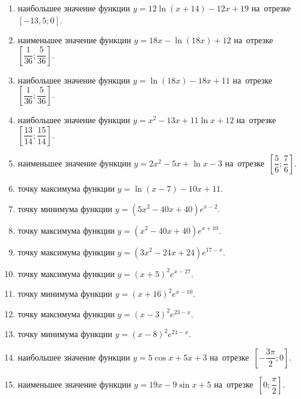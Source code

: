 \documentclass[a4paper,10pt]{article}
\begin{document}
\begin{enumerate}
\item {} наибольшее значение функции $y = 12\ln \left(x+14\right)-12x +19$ на~отрезке~$\left[-13,5;0\right]$.

\item {} наименьшее значение функции $y = 18x-\ln \left(18x\right)+12$ на~отрезке~$\left[\dfrac{1}{36};\dfrac{5}{36}\right]$.

\item {} наибольшее значение функции $y = \ln \left(18x\right)-18x+11$ на~отрезке~$\left[\dfrac{1}{36};\dfrac{5}{36}\right]$.

\item {} наибольшее значение функции $y=x^2-13x+11\ln x+12$ на~отрезке~$\left[\dfrac{13}{14};\dfrac{15}{14}\right]$.

\item {} наименьшее значение функции $y=2x^2-5x+\ln x-3$ на~отрезке~$\left[\dfrac{5}{6};\dfrac{7}{6}\right]$.

\item {} точку максимума функции $y=\ln \left(x-7\right)-10x+11$.

\item {} точку минимума функции $y=\left(5x^2-40x+40\right)e^{x-2}$.

\item {} точку максимума функции $y=\left(x^2-40x+40\right)e^{x+10}$.

\item {} точку максимума функции $y=\left(3x^2-24x+24\right)e^{17-x}$.

\item {} точку максимума функции $y=\left(x +5\right)^2e^{x-27}$.

\item {} точку минимума функции $y=\left(x +16\right)^2e^{x-10}$.

\item {} точку максимума функции $y=\left(x -3\right)^2e^{23-x}$.

\item {} точку минимума функции $y=\left(x -8\right)^2e^{21-x}$.

\item {} наибольшее значение функции $y=5\cos x+5x +3$ на~отрезке~$\left[-\dfrac{3\pi }{2};0\right]$.

\item {} наименьшее значение функции $y=19x-9\sin x +5$ на~отрезке~$\left[0;\dfrac{\pi }{2}\right]$.


\end{enumerate}
\end{document}
